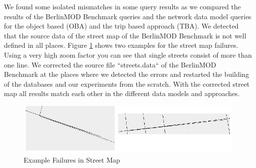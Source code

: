 \documentclass[a4paper]{article}
\newcommand{\bmodb} {BerlinMOD Benchmark}
\begin{document}
{We found some isolated mismatches in some query results as we compared the results
of the \bmodb{} queries and the network data model queries for the object based (OBA)
and the trip based approach (TBA). We detected that the source data of the street
map of the \bmodb{} is not well defined in all places.
Figure \ref{fig:routefailure} shows two examples for the street map failures. Using
a very high zoom factor you can see that single streets consist of more than one
line. We corrected the source file ``streets.data`` of the \bmodb{} at the places
where we detected the errors and restarted the building of the databases and our
experiments from the scratch. With the corrected street map all results match
each other in the different data models and approaches.
\begin{figure}[H]
\begin{center}
   \includegraphics[scale=1.0]{routefailure.eps}
   \caption{Example Failures in Street Map}
   \label{fig:routefailure}
   \end{center}
\end{figure}
}
\end{document}
